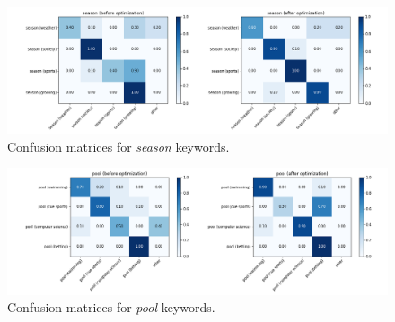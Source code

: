 \documentclass{llncs}
\begin{document}
\begin{figure}
    \centering
    \caption{Confusion matrices for \textit{season} keywords.}
    \label{fig:cm_season}
    \includegraphics[scale=0.38]{res/cm_season.png}
\end{figure}

\begin{figure}
    \centering
    \caption{Confusion matrices for \textit{pool} keywords.}
    \label{fig:cm_pool}
    \includegraphics[scale=0.38]{res/cm_pool.png}
\end{figure}
\end{document}
